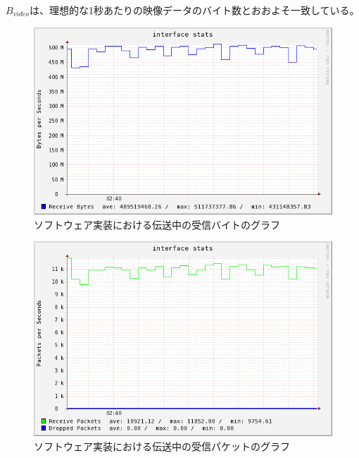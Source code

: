 $B_{video}$は、理想的な1秒あたりの映像データのバイト数とおおよそ一致している。

\begin{figure}[htbp]
  \begin{center}
    \includegraphics[bb=0 0 597 374,width=11.8cm]{img/lo-bytes-graph.png}
  \end{center}
  \caption{ソフトウェア実装における伝送中の受信バイトのグラフ}
  \label{fig:lo-bytes-graph}
\end{figure}

\begin{figure}[htbp]
  \begin{center}
    \includegraphics[bb=0 0 597 388,width=11.8cm]{img/lo-packets-graph.png}
  \end{center}
  \caption{ソフトウェア実装における伝送中の受信パケットのグラフ}
  \label{fig:lo-packets-graph}
\end{figure}

